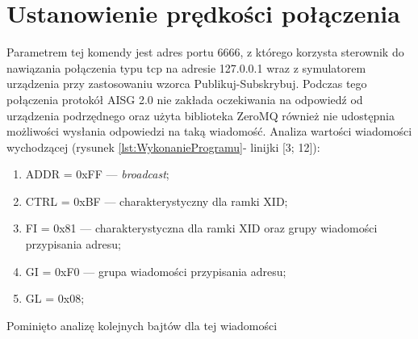     \section{Ustanowienie prędkości połączenia}
    Parametrem tej komendy jest adres portu 6666, z którego korzysta sterownik do nawiązania połączenia typu tcp na adresie 127.0.0.1 wraz z symulatorem urządzenia
    przy zastosowaniu wzorca Publikuj-Subskrybuj. Podczas tego połączenia protokół AISG 2.0 nie zakłada oczekiwania na odpowiedź od urządzenia podrzędnego oraz użyta biblioteka
    ZeroMQ również nie udostępnia możliwości wysłania odpowiedzi na taką wiadomość.
    \newline
	Analiza wartości wiadomości wychodzącej (rysunek \ref{lst:WykonanieProgramu}- linijki [3; 12]):
	\begin{enumerate}
        \item ADDR = 0xFF --- \textit{broadcast};
        \item CTRL = 0xBF --- charakterystyczny dla ramki XID;
        \item FI = 0x81 --- charakterystyczna dla ramki XID oraz grupy wiadomości przypisania adresu;
        \item GI = 0xF0 --- grupa wiadomości przypisania adresu;
        \item GL = 0x08;
    \end{enumerate}
    Pominięto analizę kolejnych bajtów dla tej wiadomości %
